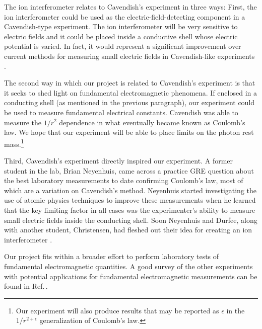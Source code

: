 The ion interferometer relates to Cavendish's experiment in three ways: First, the ion interferometer could be used as the electric-field-detecting component in a Cavendish-type experiment. The ion interferometer will be very sensitive to electric fields and it could be placed inside a conductive shell whose electric potential is varied. In fact, it would represent a significant improvement over current methods for measuring small electric fields in Cavendish-like experiments \cite{NSFprop}. 

The second way in which our project is related to Cavendish's experiment is that it seeks to shed light on fundamental electromagnetic phenomena. If enclosed in a conducting shell (as mentioned in the previous paragraph), our experiment could be used to measure fundamental electrical constants. Cavendish was able to measure the $1/r^2$ dependence in what eventually became known as Coulomb's law. We hope that our experiment will be able to place limits on the photon rest mass.\footnote{Our experiment will also produce results that may be reported as $\epsilon$ in the $1/r^{2+\epsilon}$ generalization of Coulomb's law.}

Third, Cavendish's experiment directly inspired our experiment.
A former student in the lab, Brian Neyenhuis, came across a practice GRE question%
 about the best laboratory measurements to date confirming Coulomb's law, most of which are a variation on Cavendish's method. Neyenhuis started investigating the use of atomic physics techniques to improve these measurements when he learned that the key limiting factor in all cases was the experimenter's ability to measure small electric fields inside the conducting shell. Soon Neyenhuis and Durfee, along with another student, Christensen, had fleshed out their idea for creating an ion interferometer \cite{christensen_arxiv_calcs} \cite{NeyenhuisIon}.  

Our project fits within a broader effort to perform laboratory tests of fundamental electromagnetic quantities. A good survey of the other experiments with potential applications for fundamental electromagnetic measurements can be found in Ref.\,\cite{PhotonMassSurvey}. 

